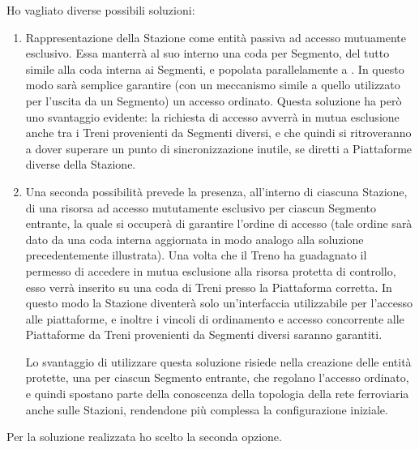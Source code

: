 \begin{description}
		Ho vagliato diverse possibili soluzioni:
		\begin{enumerate}
			\item Rappresentazione della Stazione come entità passiva ad accesso mutuamente esclusivo. Essa manterrà al suo interno una coda per Segmento, del tutto simile alla coda  interna ai Segmenti, e popolata parallelamente a . In questo modo sarà semplice garantire (con un meccanismo simile a quello utilizzato per l'uscita da un Segmento) un accesso ordinato. Questa soluzione ha però uno svantaggio evidente: la richiesta di accesso avverrà in mutua esclusione anche tra i Treni provenienti da Segmenti diversi, e che quindi si ritroveranno a dover superare un punto di sincronizzazione inutile, se diretti a Piattaforme diverse della Stazione.
			\item Una seconda possibilità prevede la presenza, all'interno di ciascuna Stazione, di una risorsa ad accesso mututamente esclusivo per ciascun Segmento entrante, la quale si occuperà di garantire l'ordine di accesso (tale ordine sarà dato da una coda interna aggiornata in modo analogo alla soluzione precedentemente illustrata). Una volta che il Treno ha guadagnato il permesso di accedere in mutua esclusione alla risorsa protetta di controllo, esso verrà inserito su una coda di Treni presso la Piattaforma corretta.
			In questo modo la Stazione diventerà solo un'interfaccia utilizzabile per l'accesso alle piattaforme, e inoltre i vincoli di ordinamento e accesso concorrente alle Piattaforme da Treni provenienti da Segmenti diversi saranno garantiti.
			
			Lo svantaggio di utilizzare questa soluzione risiede nella creazione delle entità protette, una per ciascun Segmento entrante, che regolano l'accesso ordinato, e quindi spostano parte della conoscenza della topologia della rete ferroviaria anche sulle Stazioni, rendendone più complessa la configurazione iniziale.
		\end{enumerate} 
		
		Per la soluzione realizzata ho scelto la seconda opzione.
		
		\item{}\\
		

\end{description}
